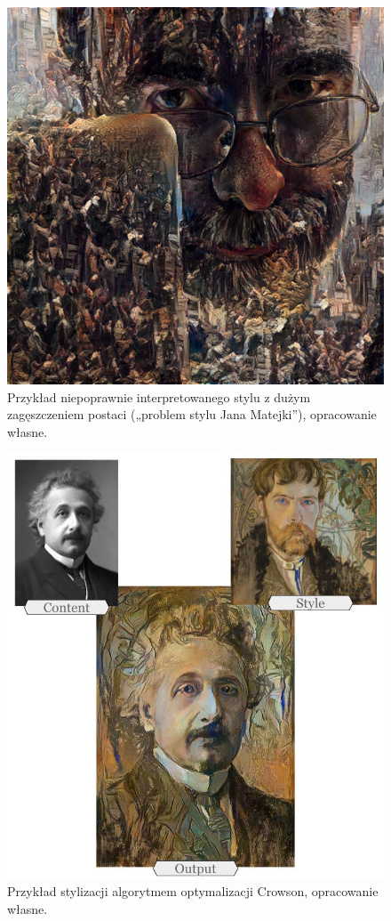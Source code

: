 \documentclass[12pt]{article}
\begin{document}
\begin{figure}[H]
    \centering
    \includegraphics[scale=0.75]{u19.png}
    \caption{Przykład niepoprawnie interpretowanego stylu z dużym zagęszczeniem postaci („problem stylu Jana Matejki”), opracowanie własne.}
    \label{fig:14:1}
\end{figure}

\begin{figure}[H]
    \centering
    \includegraphics[width=\textwidth]{u20.png}
    \caption{Przykład stylizacji algorytmem optymalizacji Crowson, opracowanie własne.}
    \label{fig:14:2}
\end{figure}
\end{document}
